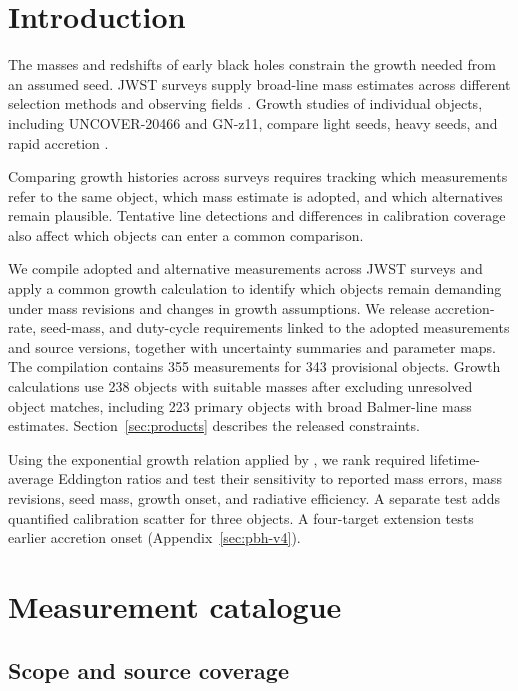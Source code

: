 \documentclass[pdflatex,sn-basic]{sn-jnl}
\begin{document}
\section{Introduction}

The masses and redshifts of early black holes constrain the growth needed
from an assumed seed. JWST surveys supply broad-line mass estimates
across different selection methods and observing fields
\citep{harikane2023,matthee2024,baccus2026}. Growth studies of individual
objects, including UNCOVER-20466 and GN-z11, compare light seeds, heavy seeds,
and rapid accretion \citep{kokorev2023,maiolino2024}.

Comparing growth histories across surveys requires
tracking which measurements refer to the
same object, which mass estimate is adopted, and which alternatives remain
plausible. Tentative line detections and differences in calibration coverage
also affect which objects can enter a common comparison.

We compile adopted and alternative measurements across JWST surveys and apply
a common growth calculation to identify which objects remain demanding under
mass revisions and changes in growth assumptions. We release accretion-rate,
seed-mass, and duty-cycle requirements linked to the adopted measurements and
source versions, together with uncertainty summaries and parameter maps.
The compilation contains 355 measurements for 343 provisional objects.
Growth calculations use 238 objects with suitable masses after excluding
unresolved object matches, including 223 primary objects with broad Balmer-line
mass estimates. Section~\ref{sec:products} describes the released constraints.

Using the exponential growth relation applied by \citet{dayal2024}, we rank
required lifetime-average Eddington ratios and test their sensitivity to
reported mass errors, mass revisions, seed mass, growth onset, and radiative
efficiency. A separate test adds quantified calibration scatter for three objects.
A four-target extension tests earlier accretion onset
(Appendix~\ref{sec:pbh-v4}).

\section{Measurement catalogue}
\label{sec:catalogue}

\subsection{Scope and source coverage}
\end{document}
